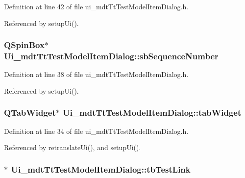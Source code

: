 Definition at line 42 of file ui\-\_\-mdt\-Tt\-Test\-Model\-Item\-Dialog.\-h.



Referenced by setup\-Ui().

\hypertarget{class_ui__mdt_tt_test_model_item_dialog_a66803ed86dfd373dac31f077c44bcf41}{
\subsubsection[{sb\-Sequence\-Number}]{\setlength{\rightskip}{0pt plus 5cm}Q\-Spin\-Box$\ast$ Ui\-\_\-mdt\-Tt\-Test\-Model\-Item\-Dialog\-::sb\-Sequence\-Number}}\label{class_ui__mdt_tt_test_model_item_dialog_a66803ed86dfd373dac31f077c44bcf41}


Definition at line 38 of file ui\-\_\-mdt\-Tt\-Test\-Model\-Item\-Dialog.\-h.



Referenced by setup\-Ui().

\hypertarget{class_ui__mdt_tt_test_model_item_dialog_ab3a5d1e5fee31a51447e66970d97ec34}{
\subsubsection[{tab\-Widget}]{\setlength{\rightskip}{0pt plus 5cm}Q\-Tab\-Widget$\ast$ Ui\-\_\-mdt\-Tt\-Test\-Model\-Item\-Dialog\-::tab\-Widget}}\label{class_ui__mdt_tt_test_model_item_dialog_ab3a5d1e5fee31a51447e66970d97ec34}


Definition at line 34 of file ui\-\_\-mdt\-Tt\-Test\-Model\-Item\-Dialog.\-h.



Referenced by retranslate\-Ui(), and setup\-Ui().

\hypertarget{class_ui__mdt_tt_test_model_item_dialog_a9db4eb5ee6a811e87ff44d0a48e5be28}{
\subsubsection[{tb\-Test\-Link}]{$\ast$ Ui\-\_\-mdt\-Tt\-Test\-Model\-Item\-Dialog\-::tb\-Test\-Link}}\label{class_ui__mdt_tt_test_model_item_dialog_a9db4eb5ee6a811e87ff44d0a48e5be28}


